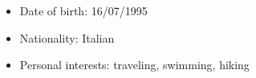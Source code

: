 \begin{itemize}
    \item Date of birth: 16/07/1995 \vspace{-0.2cm}
    \item Nationality: Italian \vspace{-0.2cm}
    \item Personal interests: traveling, swimming, hiking 
\end{itemize}